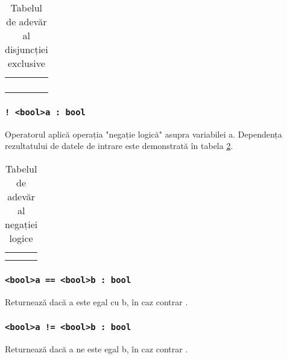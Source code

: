 \begin{table}[htb]
	\caption{Tabelul de adevăr al disjuncției exclusive}
	\label{logdifftable}
	\begin{tabular}{|c|c|c|}
		\hline
		\code{a} & \code{b} & \code{a \^ b} \\ \hline
		\false{} & \false{} & \false{}  	\\ \hline
		\false{} & \true{}  & \true{}   	\\ \hline
		\true{}  & \false{} & \true{}  		\\ \hline
		\true{}  & \true{}  & \false{}  	\\ \hline
	\end{tabular}
	\vspace{-2em}
\end{table}

\subsubsection{\lstinline|! <bool>a : bool|}

Operatorul aplică operația "negație logică" asupra variabilei a. Dependența rezultatului de datele de intrare este demonstrată în tabela  \ref{invtable}.

\begin{table}[htb]
	\caption{Tabelul de adevăr al negației logice}
	\label{invtable}
	\begin{tabular}{|c|c|}
		\hline
		\code{a} & \code{!a} \\ \hline
		\false{} & \true{} 	 \\ \hline
		\true{}  & \false{}  \\ \hline
	\end{tabular}
	\vspace{-2em}
\end{table}

\subsubsection{\lstinline|<bool>a == <bool>b : bool|}

Returnează \true{} dacă a este egal cu b, în caz contrar \false{}.

\subsubsection{\lstinline|<bool>a != <bool>b : bool|}

Returnează \true{} dacă a ne este egal b, în caz contrar \false{}.


